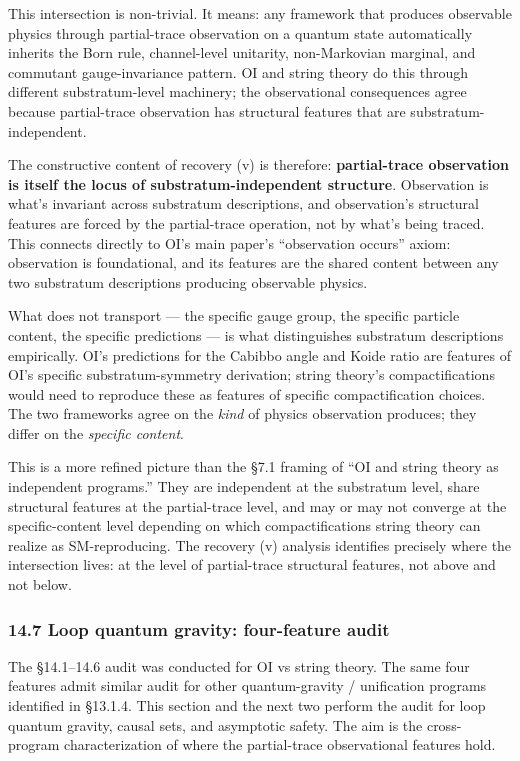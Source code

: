 \documentclass[
]{article}
\begin{document}
This intersection is non-trivial. It means: any framework that produces
observable physics through partial-trace observation on a quantum state
automatically inherits the Born rule, channel-level unitarity,
non-Markovian marginal, and commutant gauge-invariance pattern. OI and
string theory do this through different substratum-level machinery; the
observational consequences agree because partial-trace observation has
structural features that are substratum-independent.

The constructive content of recovery (v) is therefore:
\textbf{partial-trace observation is itself the locus of
substratum-independent structure}. Observation is what's invariant
across substratum descriptions, and observation's structural features
are forced by the partial-trace operation, not by what's being traced.
This connects directly to OI's main paper's ``observation occurs''
axiom: observation is foundational, and its features are the shared
content between any two substratum descriptions producing observable
physics.

What does not transport --- the specific gauge group, the specific
particle content, the specific predictions --- is what distinguishes
substratum descriptions empirically. OI's predictions for the Cabibbo
angle and Koide ratio are features of OI's specific substratum-symmetry
derivation; string theory's compactifications would need to reproduce
these as features of specific compactification choices. The two
frameworks agree on the \emph{kind} of physics observation produces;
they differ on the \emph{specific content}.

This is a more refined picture than the §7.1 framing of ``OI and string
theory as independent programs.'' They are independent at the substratum
level, share structural features at the partial-trace level, and may or
may not converge at the specific-content level depending on which
compactifications string theory can realize as SM-reproducing. The
recovery (v) analysis identifies precisely where the intersection lives:
at the level of partial-trace structural features, not above and not
below.

\hypertarget{loop-quantum-gravity-four-feature-audit}{%
\subsubsection{14.7 Loop quantum gravity: four-feature
audit}\label{loop-quantum-gravity-four-feature-audit}}

The §14.1--14.6 audit was conducted for OI vs string theory. The same
four features admit similar audit for other quantum-gravity /
unification programs identified in §13.1.4. This section and the next
two perform the audit for loop quantum gravity, causal sets, and
asymptotic safety. The aim is the cross-program characterization of
where the partial-trace observational features hold.
\end{document}
